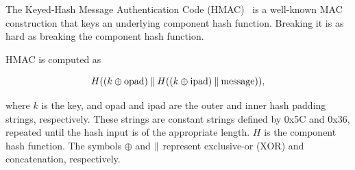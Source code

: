The Keyed-Hash Message Authentication Code (HMAC)~\cite{HMAC,FIPS-198-1,rfc2104,nist107} 
is a well-known MAC construction that keys an underlying component hash function.  
Breaking it is as hard as breaking the component hash function.

HMAC is computed as

\begin{equation}
H((k\oplus \text{opad})\mathbin{\|} H((k\oplus \text{ipad})\mathbin{\|} \text{message})) ,
\end{equation}

\noindent
where $k$ is the key, and opad and ipad are the outer and inner hash padding strings, respectively. 
These strings are constant strings defined by 0x5C and 0x36, repeated until the hash input is of the appropriate length. 
$H$ is the component hash function. 
The symbols $\oplus$ and $\mathbin{\|}$ represent exclusive-or (XOR) and concatenation, respectively.





